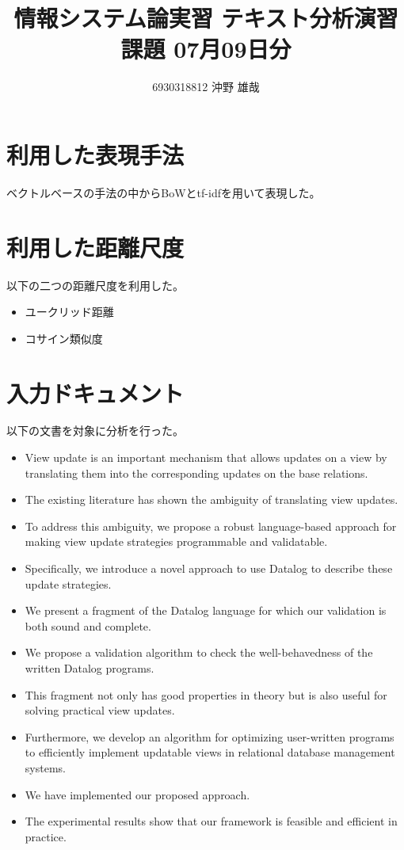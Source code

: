 \documentclass{jsarticle}
\begin{document}
\title{情報システム論実習 テキスト分析演習課題 07月09日分}
\author{6930318812 沖野 雄哉}
\maketitle

\section{利用した表現手法}
ベクトルベースの手法の中からBoWとtf-idfを用いて表現した。

\section{利用した距離尺度}
以下の二つの距離尺度を利用した。
\begin{itemize}
  \item ユークリッド距離
  \item コサイン類似度
\end{itemize}

\section{入力ドキュメント}
以下の文書を対象に分析を行った。

\begin{itemize}
  \item View update is an important mechanism that allows updates on a view by translating them into the corresponding updates on the base relations.
  \item The existing literature has shown the ambiguity of translating view updates.
  \item To address this ambiguity, we propose a robust language-based approach for making view update strategies programmable and validatable.
  \item Specifically, we introduce a novel approach to use Datalog to describe these update strategies.
  \item We present a fragment of the Datalog language for which our validation is both sound and complete.
  \item We propose a validation algorithm to check the well-behavedness of the written Datalog programs.
  \item This fragment not only has good properties in theory but is also useful for solving practical view updates.
  \item Furthermore, we develop an algorithm for optimizing user-written programs to efficiently implement updatable views in relational database management systems.
  \item We have implemented our proposed approach.
  \item The experimental results show that our framework is feasible and efficient in practice.
\end{itemize}
\end{document}
